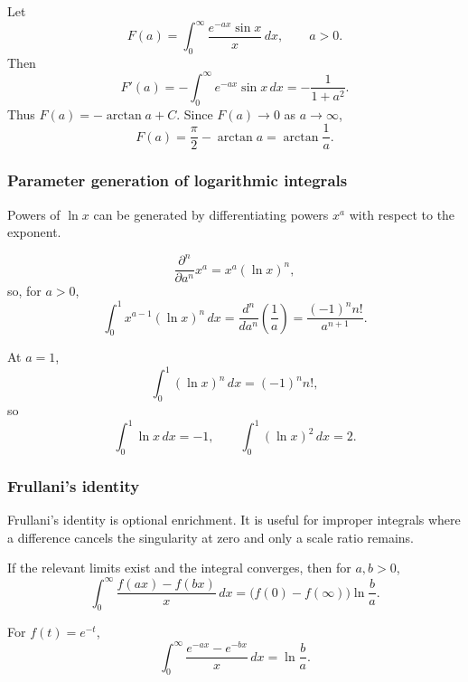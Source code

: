 \begin{examplebox}[title={Exponential Damping Parameter}]
Let
\[
F(a)=\int_0^\infty\frac{e^{-ax}\sin x}{x}\,dx,
\qquad a>0.
\]
Then
\[
F'(a)=-\int_0^\infty e^{-ax}\sin x\,dx=-\frac{1}{1+a^2}.
\]
Thus \(F(a)=-\arctan a+C\).  Since \(F(a)\to0\) as \(a\to\infty\),
\[
F(a)=\frac\pi2-\arctan a=\arctan\frac1a.
\]
\end{examplebox}

\newpage
\subsubsection{Parameter generation of logarithmic integrals}
\begin{extension}
Powers of \(\ln x\) can be generated by differentiating powers \(x^a\) with
respect to the exponent.
\end{extension}

\begin{keyformula}[title={Logarithmic Integral Generator}]
\[
\frac{\partial^n}{\partial a^n}x^a=x^a(\ln x)^n,
\]
so, for \(a>0\),
\[
\int_0^1 x^{a-1}(\ln x)^n\,dx
=\frac{d^n}{da^n}\left(\frac1a\right)
=\frac{(-1)^n n!}{a^{n+1}}.
\]
\end{keyformula}

\begin{examplebox}[title={Special Values}]
At \(a=1\),
\[
\int_0^1(\ln x)^n\,dx=(-1)^n n!,
\]
so
\[
\int_0^1\ln x\,dx=-1,
\qquad
\int_0^1(\ln x)^2\,dx=2.
\]
\end{examplebox}

\newpage
\subsubsection{Frullani's identity}
\begin{extension}
Frullani's identity is optional enrichment.  It is useful for improper integrals
where a difference cancels the singularity at zero and only a scale ratio
remains.
\end{extension}

\begin{keyformula}[title={Frullani Identity}]
If the relevant limits exist and the integral converges, then for \(a,b>0\),
\[
\int_0^\infty\frac{f(ax)-f(bx)}{x}\,dx
=\bigl(f(0)-f(\infty)\bigr)\ln\frac{b}{a}.
\]
\end{keyformula}

\begin{examplebox}[title={Exponential Frullani Integral}]
For \(f(t)=e^{-t}\),
\[
\int_0^\infty\frac{e^{-ax}-e^{-bx}}{x}\,dx=\ln\frac{b}{a}.
\]
\end{examplebox}

